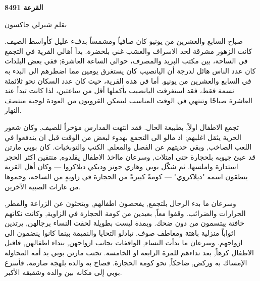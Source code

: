 \documentclass[12pt, a4paper]{article}
\begin{document}
\begin{otherlanguage}{arabic}

\begin{center}
{\arabichead\Large
  
  \textbf{ القرعة 8491}\bigbreak

  بقلم شيرلي جاكسون 
}\bigbreak
\end{center}

صباح السابع والعشرين من يونيو كان صافياً ومشمساً بدفء عليل كأواسط الصيف.  كانت الزهور مشرقة لحد الاسراف
والعشب غني بلخضرة. بدأ أهالي القرية في التجمع في الساحة، بين مكتب البريد والمصرف، حوالي الساعة العاشرة;
ففي بعض البلدات كان عدد الناس هائل لدرجة أن اليانصيب كان يستغرق يومين مما اضطرهم  الى البدء به في السابع والعشرين 
من يونيو. أما في هذه القرية، حيث كان عدد السكان نحو ثلاثمئة نسمة فقط، فقد استغرقت اليانصيب بأكملها أقل من 
ساعتين، لذا كانت تبدأ عند العاشرة صباحًا وتنتهي في الوقت المناسب ليتمكن القرويون  من العودة لوجبة منتصف النهار. 

تجمع الاطفال اولاً, بطبيعة الحال. فقد انتهت المدارس مؤخراً للصيف, وكان شعور الحرية يثقل اغلبهم; اذ مالو الى
التجمع بهدوء لبعض من الوقت قبل ان يندفعوا في اللعب الصاخب, وبقي حديثهم عن الفصل والمعلم, الكتب والتوبخيات.
كان بوبي مارتن قد عبئ جيوبه بلحجارة حتى امتلات, وسرعان مااخذ الاطفال يقلدوه, منتقين اكثر الحجر استدارة واملسها.
ثم شكّل بوبي وهاري جونز وديكي ديلاكروا — وكان أهل القرية ينطقون اسمه "ديلاكروي" — كومةً كبيرةً من الحجارة في 
زاويةٍ من الساحة، وحموها من غارات الصبية الآخرين. 

وسرعان ما بدء الرجال بلتجمع, يفحصون اطفالهم, ويتحثون عن الزراعة والمطر, الجرارات والضرائب. وقفوا معاً, بعيدين
من كومة الحجارة في الزاوية, وكانت نكاتهم خافتة يبتسمون من دون ضحك. وبمدة ليست بطويلة لحقت النساء برجالهن, 
يرتدين اثواباً منزلية باهتة ومعاطف صوف. تبادلو التحايا والنميمة بينما كانوا ينضمون الى ازواجهم. وسرعان ما بدأت
النساء, الواقفات بجانب ازواجهن, بنداء اطفالهن, فاقبل الاطفال كرهاً, بعد نداءهم للمرة الرابعة او الخامسة.
تجنب مارتن بوبي يد أمه المحاولة الإمساك به وركض, ضاحكاً, نحو كومة الحجارة. فصاح به والده بلهجة صارمة، 
فأسرع بوبي إلى مكانه بين والده وشقيقه الأكبر. 


\end{otherlanguage}
\end{document}
